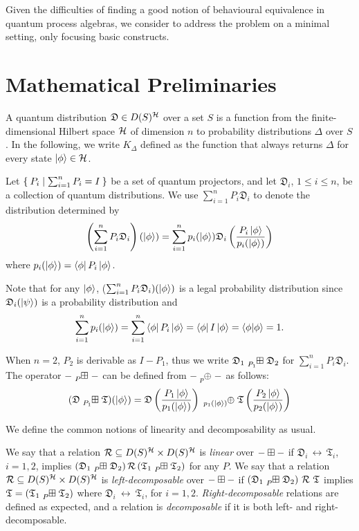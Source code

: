 \newcommand{\quantumdst}{\mathfrak{D}}
\newcommand{\quantumdsta}{\mathfrak{T}}

Given the difficulties of finding a good notion of behavioural equivalence in quantum process algebras, we consider to address the problem on a minimal setting, only focusing basic constructs.

\section{Mathematical Preliminaries}

A quantum distribution $\quantumdst \in D(S)^\hilbert$ over a set $S$ is a function from the finite-dimensional Hilbert space $\mathcal{H}$ of dimension $n$ to probability distributions $\Delta$ over $S$.
In the following, we write $K_{\Delta}$ defined as the function that always returns $\Delta$ for every state $\ket{\phi} \in \mathcal{H}$.

Let $\Set{P_i | \sum_{i = 1}^{n} P_i = I }$ be a set of quantum projectors, and let $\quantumdst_i$, $1 \leq i \leq n$, be a collection of quantum distributions.
We use $\sum_{i = 1}^{n} P_i \quantumdst_i$ to denote the distribution determined by 
\[
\left(\sum_{i = 1}^{n} P_i \quantumdst_i\right) (\ket{\phi}) = \sum_{i = 1}^{n} p_i(\ket{\phi}) \quantumdst_i \left(\frac{P_i \ket{\phi}}{p_i(\ket{\phi})}\right)
\]
where $p_i(\ket{\phi}) = \bra{\phi} P_i \ket{\phi}$.

Note that for any $\ket{\phi}$, ($\sum_{i = 1}^{n} P_i \quantumdst_i) (\ket{\phi})$ is a legal probability distribution since $\quantumdst_i(\ket{\psi})$ is a probability distribution and
\[
\sum_{i = 1}^{n} p_i (\ket{\phi}) = \sum_{i = 1}^{n} \bra{\phi} P_i \ket{\phi} = \bra{\phi} I \ket{\phi} = \braket{\phi | \phi} = 1.
\]

When $n = 2$, $P_2$ is derivable as $I - P_1$, thus we write $\quantumdst_1 \qsum{P_1} \quantumdst_2$ for $\sum_{i = 1}^{n} P_i \quantumdst_i$.
The operator $\blank \qsum{P} \blank$ can be defined from $\blank \tensor[_p]{\oplus}{} \blank$ as follows:
\[
  (\quantumdst \qsum{P_1} \quantumdsta) (\ket{\phi}) = \quantumdst \left(\frac{P_1 \ket{\phi}}{p_1(\ket{\phi})}\right) \tensor[_{p_1(\ket{\phi})}]{\oplus}{} \quantumdsta \left(\frac{P_2 \ket{\phi}}{p_2(\ket{\phi})}\right)
\]

We define the common notions of linearity and decomposability as usual.
\begin{definition}
We say that a relation $\mathcal{R} \subseteq D(S)^{\mathcal{H}} \times D(S)^{\mathcal{H}}$ is \emph{linear} over ${-} \boxplus {-}$ if $\quantumdst_i\,\rel\,\quantumdsta_i$, $i = 1,2$, implies $(\quantumdst_1 \qsum{P} \quantumdst_2)\,\rel\,(\quantumdsta_1 \qsum{P} \quantumdsta_2)$ for any $P$.
We say that a relation $\mathcal{R} \subseteq D(S)^{\mathcal{H}} \times D(S)^{\mathcal{H}}$ is \emph{left-decomposable} over ${-} \boxplus {-}$ if $(\quantumdst_1 \qsum{P} \quantumdst_2)\ \rel\ \quantumdsta$ implies $\quantumdsta = (\quantumdsta_1 \qsum{P} \quantumdsta_2)$ where $\quantumdst_i\ \rel\ \quantumdsta_i$, for $i = 1, 2$.
\emph{Right-decomposable} relations are defined as expected, and a relation is \emph{decomposable} if it is both left- and right-decomposable. 
\end{definition}

